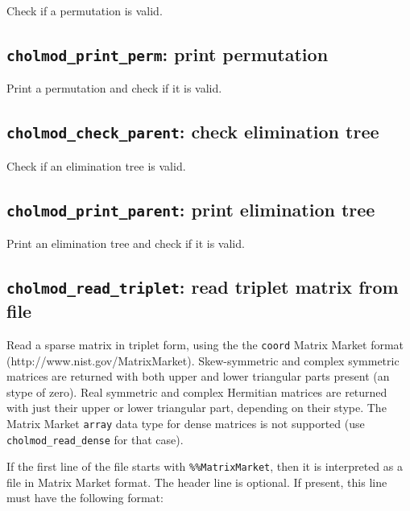 \documentclass[11pt]{article}
\begin{document}

Check if a permutation is valid.

\subsection{{\tt cholmod\_print\_perm}: print permutation}


Print a permutation and check if it is valid.

\subsection{{\tt cholmod\_check\_parent}: check elimination tree}


Check if an elimination tree is valid.

\subsection{{\tt cholmod\_print\_parent}: print elimination tree}


Print an elimination tree and check if it is valid.

\subsection{{\tt cholmod\_read\_triplet}: read triplet matrix from file}


Read a sparse matrix in triplet form, using the the {\tt coord} Matrix Market
format (http://www.nist.gov/MatrixMarket).  Skew-symmetric and complex
symmetric matrices are returned with both upper and lower triangular parts
present (an stype of zero).  Real symmetric and complex Hermitian matrices are
returned with just their upper or lower triangular part, depending on their
stype.  The Matrix Market {\tt array} data type for dense matrices is not
supported (use {\tt cholmod\_read\_dense} for that case).

If the first line of the file starts with {\tt \%\%MatrixMarket}, then it is
interpreted as a file in Matrix Market format.  The header line is optional.
If present, this line must have the following format:
\vspace{0.1in}
\end{document}
